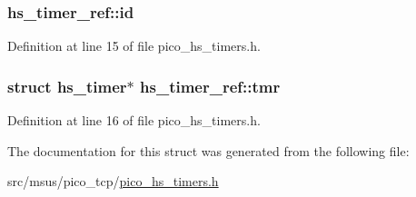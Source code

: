 \hypertarget{strucths__timer__ref_a822feae9c1d2e9b2f5d705ec1fd0c3b2}{
\subsubsection[{id}]{ hs\-\_\-timer\-\_\-ref\-::id}}\label{strucths__timer__ref_a822feae9c1d2e9b2f5d705ec1fd0c3b2}


Definition at line 15 of file pico\-\_\-hs\-\_\-timers.\-h.

\hypertarget{strucths__timer__ref_a92af37ae32ca421a4d5d6e63987544ea}{
\subsubsection[{tmr}]{\setlength{\rightskip}{0pt plus 5cm}struct {\bf hs\-\_\-timer}$\ast$ hs\-\_\-timer\-\_\-ref\-::tmr}}\label{strucths__timer__ref_a92af37ae32ca421a4d5d6e63987544ea}


Definition at line 16 of file pico\-\_\-hs\-\_\-timers.\-h.



The documentation for this struct was generated from the following file\-:\begin{DoxyCompactItemize}
\item 
src/msus/pico\-\_\-tcp/\hyperlink{pico__hs__timers_8h}{pico\-\_\-hs\-\_\-timers.\-h}\end{DoxyCompactItemize}
